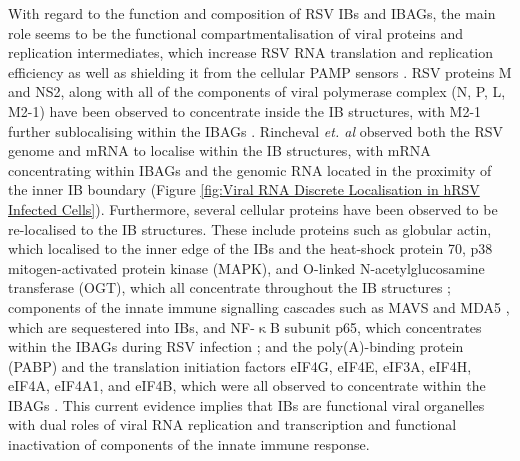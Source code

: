 With regard to the function and composition of RSV IBs and IBAGs, the main role seems to be the functional compartmentalisation of viral proteins and replication intermediates, which increase RSV RNA translation and replication efficiency as well as shielding it from the cellular PAMP sensors \cite{McDonald2004EvidenceAnalysis, Rincheval2017FunctionalVirus, Jobe2020RespiratorySignaling}. RSV proteins M and NS2, along with all of the components of viral polymerase complex (N, P, L, M2-1) have been observed to concentrate inside the IB structures, with M2-1 further sublocalising within the IBAGs \cite{Weber1995NonstructuralSerum, Fricke2013P38Assembly, Rincheval2017FunctionalVirus, Jobe2021BovineResponses}. Rincheval \textit{et. al} observed both the RSV genome and mRNA to localise within the IB structures, with mRNA concentrating within IBAGs and the genomic RNA located in the proximity of the inner IB boundary \cite{Rincheval2017FunctionalVirus} (Figure \ref{fig:Viral RNA Discrete Localisation in hRSV Infected Cells}). Furthermore, several cellular proteins have been observed to be re-localised to the IB structures. These include proteins such as globular actin, which localised to the inner edge of the IBs \cite{Brown2005EvidenceInfection} and the heat-shock protein 70, p38 mitogen-activated protein kinase (MAPK), and O-linked N-acetylglucosamine transferase (OGT), which all concentrate throughout the IB structures \cite{Brown2005EvidenceInfection, Fricke2013P38Assembly}; components of the innate immune signalling cascades such as MAVS and MDA5 \cite{Lifland2012HumanMAVS}, which are sequestered into IBs, and NF-$\upkappa$B subunit p65, which concentrates within the IBAGs during RSV infection \cite{Jobe2020RespiratorySignaling}; and the poly(A)-binding protein (PABP) and the translation initiation factors eIF4G, eIF4E, eIF3A, eIF4H, eIF4A, eIF4A1, and eIF4B, which were all observed to concentrate within the IBAGs \cite{Rincheval2017FunctionalVirus, Jobe2024ViralCondensates}. This current evidence implies that IBs are functional viral organelles with dual roles of viral RNA replication and transcription and functional inactivation of components of the innate immune response.

